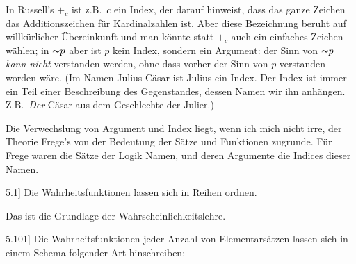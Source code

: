 \documentclass[12pt,oneside]{book}[2007/10/19]
\newcommand{\PropERef}[1]{\hyperref[PropE:#1]{#1}}
\newcommand{\PropositionG}[2]{%
  \item[\phantomsection\label{PropG:#1}\PropERef{#1}] #2%
}
\newcommand{\Not}[1]{\mathord{\thicksim} #1}
\newcommand{\Emph}[1]{\emph{#1}}%
\newcommand{\zumBeispiel}{z.\;B.}
\newcommand{\ZumBeispiel}{Z.\;B.}
\begin{document}
\begin{propositions}
{In Russell's \glqq{}$+_{c}$\grqq{} ist \zumBeispiel\ \glqq{}$c$\grqq{} ein Index, der darauf
hinweist, dass das ganze Zeichen das Additionszeichen
für Kardinalzahlen ist. Aber diese Bezeichnung
beruht auf willkürlicher Übereinkunft und
man könnte statt \glqq{}$+_{c}$\grqq{} auch ein einfaches Zeichen
wählen; in \glqq{}$\Not{p}$\grqq{} aber ist \glqq{}$p$\grqq{} kein Index, sondern
ein Argument: der Sinn von \glqq{}$\Not{p}$\grqq{} \Emph{kann nicht}
verstanden werden, ohne dass vorher der Sinn von
\glqq{}$p$\grqq{} verstanden worden wäre. (Im Namen Julius
Cäsar ist \glqq{}Julius\grqq{} ein Index. Der Index ist immer
ein Teil einer Beschreibung des Gegenstandes,
dessen Namen wir ihn anhängen. \ZumBeispiel\ \Emph{Der}
Cäsar aus dem Geschlechte der Julier.)

Die Verwechslung von Argument und Index
liegt, wenn ich mich nicht irre, der Theorie Frege's
von der Bedeutung der Sätze und Funktionen
zugrunde. Für Frege waren die Sätze der Logik
Namen, und deren Argumente die Indices dieser
Namen.}


\PropositionG{5.1}
{Die Wahrheitsfunktionen lassen sich in Reihen
ordnen.

Das ist die Grundlage der Wahrscheinlichkeitslehre.}


\PropositionG{5.101}
{Die Wahrheitsfunktionen jeder Anzahl von
Elementarsätzen lassen sich in einem Schema
folgender Art hinschreiben:

}
\end{propositions}
\end{document}
